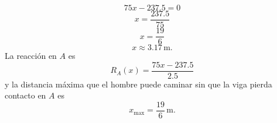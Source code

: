 \documentclass[12pt,a4paper]{article}
\begin{document}
\begin{solucion}
\begin{equation*}
            75x -237.5 = 0
        \end{equation*}
        \begin{equation*}
            x = \frac{237.5}{75}
        \end{equation*}
        \begin{equation*}
            x = \frac{19}{6}
        \end{equation*}
        \begin{equation*}
            x \approx 3.17\,\text{m}.
        \end{equation*}
        La reacción en $A$ es
        \begin{equation*}
            R_A(x)=\frac{75x-237.5}{2.5}
        \end{equation*}
        y la distancia máxima que el hombre puede caminar sin que la viga
        pierda contacto en $A$ es
        \begin{equation*}
            x_{\max} = \frac{19}{6}\,\text{m}.
        \end{equation*}
    \end{solucion}
\end{document}
